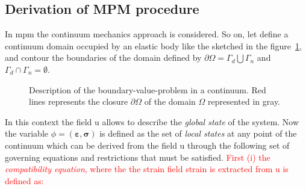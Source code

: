 \documentclass[preprint,12pt,a4paper]{elsarticle}
\newcommand{\tens}[1]{
  \ensuremath{\mathbf{{#1}}}
}
\newcommand{\PNA}[1]{
  \textcolor{red}{{#1}}
}
\begin{document}
\subsection{Derivation of MPM procedure}
\label{sec:derivation-mpm}

In \acrshort{mpm} the continuum mechanics approach is considered. So on, let
define a continuum \gls{domain}  occupied by an elastic body like
the sketched in the figure~\ref{fig:Continuum-solid}, and \gls{contour} the boundaries of the domain defined by $\partial \varOmega
= \Gamma_d \bigcup \Gamma_n$ and $\Gamma_d \cap  \Gamma_n = \emptyset$.
\begin{figure}\sidecaption
  \centering
  \caption{Description of the boundary-value-problem in a
    continuum. Red lines represents the closure $\partial \varOmega$
    of the domain $\varOmega$ represented in gray.}
  \label{fig:Continuum-solid}
\end{figure}
In this context the field \gls{u} allows to describe the \textit{global state}
of the system. Now the variable $\phi =
(\tens{\varepsilon},\tens{\sigma})$ is defined as the set of \textit{local
  states} at any point of the continuum which can be derived from the
field \gls{u} through the following set of governing equations and
restrictions that must be satisfied. \PNA{First (i) the \textit{compatibility
  equation}, where the the strain field \gls{strain} is extracted from \gls{u} is defined as:}
\end{document}
